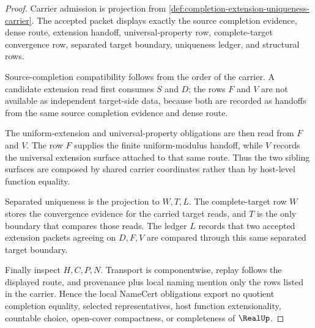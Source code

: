 \begin{proof}
Carrier admission is projection from \autoref{def:completion-extension-uniqueness-carrier}. The accepted packet displays exactly the source completion evidence, dense route, extension handoff, universal-property row, complete-target convergence row, separated target boundary, uniqueness ledger, and structural rows.

Source-completion compatibility follows from the order of the carrier. A candidate extension read first consumes $S$ and $D$; the rows $F$ and $V$ are not available as independent target-side data, because both are recorded as handoffs from the same source completion evidence and dense route.

The uniform-extension and universal-property obligations are then read from $F$ and $V$. The row $F$ supplies the finite uniform-modulus handoff, while $V$ records the universal extension surface attached to that same route. Thus the two sibling surfaces are composed by shared carrier coordinates rather than by host-level function equality.

Separated uniqueness is the projection to $W,T,L$. The complete-target row $W$ stores the convergence evidence for the carried target reads, and $T$ is the only boundary that compares those reads. The ledger $L$ records that two accepted extension packets agreeing on $D,F,V$ are compared through this same separated target boundary.

Finally inspect $H,C,P,N$. Transport is componentwise, replay follows the displayed route, and provenance plus local naming mention only the rows listed in the carrier. Hence the local NameCert obligations export no quotient completion equality, selected representatives, host function extensionality, countable choice, open-cover compactness, or completeness of $\RealUp$.
\end{proof}

